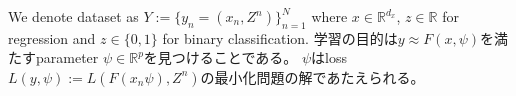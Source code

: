             We denote dataset as \(Y:= \{y_n = \left(  x_n , Z^n  \right)\} ^{N}_{n=1} \)
            where \(x \in \mathbb{R}^{d_x}\), \(z \in \mathbb{R}\)  for regression and \(z \in  \{ 0,1 \}\) for binary classification.
            学習の目的は\( y \approx F \left( x, \psi \right) \)を満たすparameter \(\psi \in \mathbb{R}^{p}\)を見つけることである。
            \(\psi\)はloss \(L \left( y, \psi \right) := L \left( F(x_n \psi) ,Z^{n} \right)\)の最小化問題の解であたえられる。
